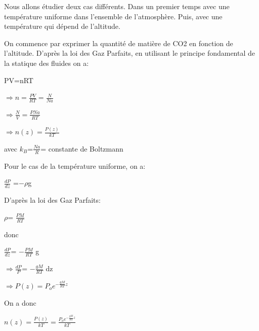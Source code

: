 \documentclass[a4paper, 12pt]{report} %
\begin{document}
Nous allons étudier deux cas différents. Dans un premier temps avec une température uniforme dans l'ensemble de l'atmosphère. Puis, avec une température qui dépend de l'altitude. 

On commence par exprimer la quantité de matière de CO2 en fonction de l'altitude.
D'après la loi des Gaz Parfaits, en utilisant le principe fondamental de la statique des fluides on a: 

\begin{center}
    PV=nRT
\end{center}

\begin{center}
    $\Rightarrow n= \frac{PV}{RT}=\frac{N}{Na}$
\end{center}

\begin{center}
    $\Rightarrow\frac{N}{V}= \frac{PNa}{RT}$
\end{center}

\begin{center}
    $\Rightarrow n(z)= \frac{P(z)}{kT} $ 
\end{center}   

avec $k_B$=$\frac{Na}{R}$= constante de Boltzmann \vspace{\baselineskip}

Pour le cas de la température uniforme, on a:

\begin{center}
    $\frac{dP}{dz}$ =$-\rho$g
\end{center}

D'après la loi des Gaz Parfaits: 
\begin{center}
    $\rho$= $\frac{PM}{RT}$
\end{center}

donc 
\begin{center}
    $\frac{dP}{dz}$= $-\frac{PM}{RT}$ g
\end{center}

\begin{center}
    $\Rightarrow\frac{dP}{P}$= $-\frac{gM}{RT}$ dz
\end{center}

\begin{center}
    $\Rightarrow P(z)= P_o e^{-\frac{gM}{RT} z }$
\end{center}

On a donc 
\begin{center}
	$n(z)=\frac{P(z)}{kT}= \frac{ P_o e^{-\frac{gM}{RT} z }}{kT}$
 \end{center}
\end{document}
